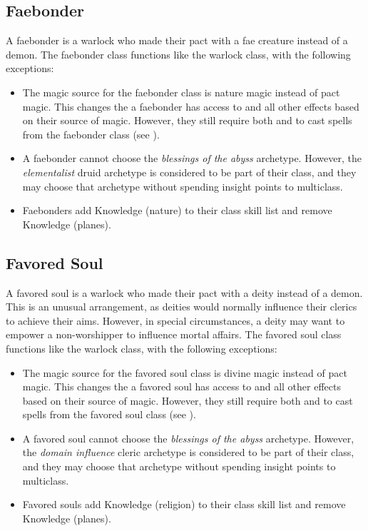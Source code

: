     \subsection{Faebonder}
        A faebonder is a warlock who made their pact with a fae creature instead of a demon.
        The faebonder class functions like the warlock class, with the following exceptions:
        \begin{itemize}
            \item The magic source for the faebonder class is nature magic instead of pact magic.
                This changes the  a faebonder has access to and all other effects based on their source of magic.
                However, they still require both  and  to cast spells from the faebonder class (see ).
            \item A faebonder cannot choose the \textit{blessings of the abyss} archetype. However, the \textit{elementalist} druid archetype is considered to be part of their class, and they may choose that archetype without spending insight points to multiclass.
            \item Faebonders add Knowledge (nature) to their class skill list and remove Knowledge (planes).
        \end{itemize}

    \subsection{Favored Soul}
        A favored soul is a warlock who made their pact with a deity instead of a demon.
        This is an unusual arrangement, as deities would normally influence their clerics to achieve their aims.
        However, in special circumstances, a deity may want to empower a non-worshipper to influence mortal affairs.
        The favored soul class functions like the warlock class, with the following exceptions:
        \begin{itemize}
            \item The magic source for the favored soul class is divine magic instead of pact magic.
                This changes the  a favored soul has access to and all other effects based on their source of magic.
                However, they still require both  and  to cast spells from the favored soul class (see ).
            \item A favored soul cannot choose the \textit{blessings of the abyss} archetype. However, the \textit{domain influence} cleric archetype is considered to be part of their class, and they may choose that archetype without spending insight points to multiclass.
            \item Favored souls add Knowledge (religion) to their class skill list and remove Knowledge (planes).
        \end{itemize}

